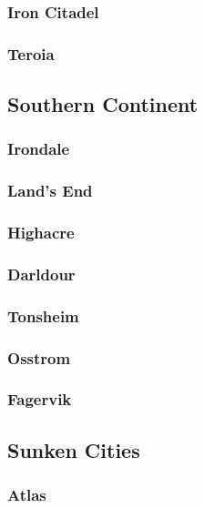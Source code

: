 		\subsubsection{Iron Citadel}

		\subsubsection{Teroia}

	\subsection{Southern Continent}

		\subsubsection{Irondale}

		\subsubsection{Land's End}

		\subsubsection{Highacre}
	
		\subsubsection{Darldour}

		\subsubsection{Tonsheim}

		\subsubsection{Osstrom}

		\subsubsection{Fagervik}

	\subsection{Sunken Cities}

		\subsubsection{Atlas}

